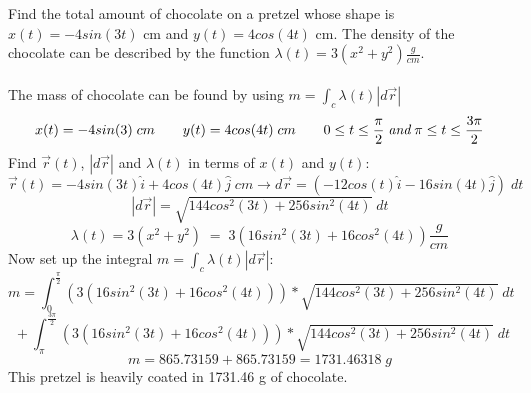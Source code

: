 \documentclass[11pt]{article}
\begin{document}
Find the total amount of chocolate on a pretzel whose shape is $x(t) = -4sin(3t)$ cm and $y(t) = 4cos(4t)$ cm. The density of the chocolate can be described by the function $\lambda(t) = 3(x^2+y^2)\frac{g}{cm}$.
\\
\\
The mass of chocolate can be found by using $m=\int_c\lambda(t)|d\vec{r}|$
$$x(t) = -4sin(3)\;cm \qquad y(t)=4cos(4t)\;cm \qquad 0 \leq t \leq \frac{\pi}{2} \;\emph{and}\; \pi \leq t \leq \frac{3\pi}{2}$$
Find $\vec{r}(t)$, $|d\vec{r}|$ and $\lambda (t)$ in terms of $x(t)$ and $y(t)$:
$$\vec{r}(t) = -4sin(3t)\hat{i} + 4cos(4t)\hat{j} \;cm \rightarrow d\vec{r} = (-12cos(t)\hat{i}-16sin(4t)\hat{j})\;dt$$
$$|d\vec{r}| = \sqrt{144cos^2(3t)+256sin^2(4t)}\;dt$$
$$\lambda(t) = 3(x^2+y^2)\;=\;3(16sin^2(3t)+16cos^2(4t))\frac{g}{cm}$$
Now set up the integral  $m=\int_c\lambda(t)|d\vec{r}|$:
$$m = \int_0^\frac{\pi}{2} \left( 3(16sin^2(3t)+16cos^2(4t)) \right)*\sqrt{144cos^2(3t)+256sin^2(4t)}\;dt$$
$$\;+\int_\pi^\frac{3\pi}{2} \left( 3(16sin^2(3t)+16cos^2(4t)) \right)*\sqrt{144cos^2(3t)+256sin^2(4t)}\;dt$$
$$m = 865.73159 + 865.73159 = 1731.46318 \;g$$
This pretzel is heavily coated in 1731.46 g of chocolate.
\end{document}
